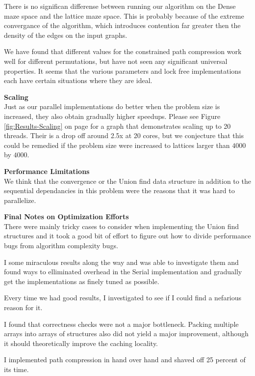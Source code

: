 \documentclass[11pt]{article}
\begin{document}
There is no significan differense between running our algorithm on the Dense maze space and the lattice maze space. This is probably because of the extreme convergance of the algorithm, which introduces contention far greater then the density of the edges on the input graphs.

We have found that different values for the constrained path compression work well for different permutations, but have not seen any significant universal properties. It seems that the various parameters and lock free implementations each have certain situations where they are ideal.


\textbf{Scaling}\\
Just as our parallel implementations do better when the problem size is increased, they also obtain gradually higher speedups. Please see Figure \ref{fig:Results-Scaling} on page \pageref{fig:Results-Scaling} for a graph that demonstrates scaling up to 20 threads. Their is a drop off around 2.5x at 20 cores, but we conjecture that this could be remedied if the problem size were increased to lattices larger than $4000$ by $4000$.

\textbf{Performance Limitations}\\

We think that the convergence or the Union find data structure in addition to the sequential dependancies in this problem were the reasons that it was hard to parallelize.

\textbf{Final Notes on Optimization Efforts}\\


There were mainly tricky cases to consider when implementing the Union find structures and it took a good bit of effort to figure out how to divide performance bugs from algorithm complexity bugs.

I some miraculous results along the way and was able to investigate them and found ways to elliminated overhead in the Serial implementation and gradually get the implementations as finely tuned as possible.

Every time we had good results, I investigated to see if I could find a nefarious reason for it.

I found that correctness checks were not a major bottleneck. Packing multiple arrays into arrays of structures also did not yield a major improvement, although it should theoretically improve the caching locality.

I implemented path compression in hand over hand and shaved off 25 percent of its time.
\end{document}
